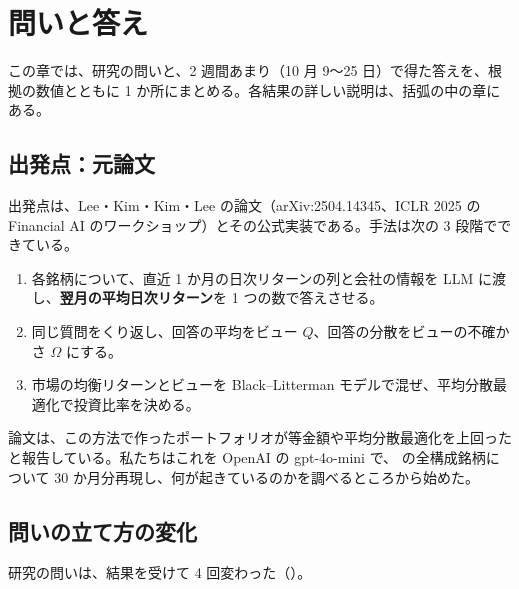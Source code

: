 \chapter{問いと答え}\label{ch:qa}

この章では、研究の問いと、2 週間あまり（10 月 9〜25 日）で得た答えを、根拠の数値とともに 1 か所にまとめる。各結果の詳しい説明は、括弧の中の章にある。

\section{出発点：元論文}

出発点は、Lee・Kim・Kim・Lee の論文（arXiv:2504.14345、ICLR 2025 の Financial AI のワークショップ）とその公式実装である。手法は次の 3 段階でできている。

\begin{enumerate}
\item 各銘柄について、直近 1 か月の日次リターンの列と会社の情報を LLM に渡し、\textbf{翌月の平均日次リターン}を 1 つの数で答えさせる。
\item 同じ質問をくり返し、回答の平均をビュー $Q$、回答の分散をビューの不確かさ $\Omega$ にする。
\item 市場の均衡リターンとビューを Black--Litterman モデルで混ぜ、平均分散最適化で投資比率を決める。
\end{enumerate}

論文は、この方法で作ったポートフォリオが等金額や平均分散最適化を上回ったと報告している。私たちはこれを OpenAI の gpt-4o-mini で、\SP{} の全構成銘柄について 30 か月分再現し、何が起きているのかを調べるところから始めた。

\section{問いの立て方の変化}

研究の問いは、結果を受けて 4 回変わった（）。

